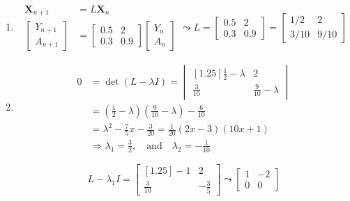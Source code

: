 \documentclass[letter,11pt]{article}
\theoremstyle{definition}
\begin{document}
\begin{tcolorbox}
    \begin{enumerate}[label = (\Alph*.)]
        \item  
            $$\begin{aligned}
                \mathbf{X}_{n+1} &= L \mathbf{X}_n\\
                \begin{bmatrix} Y_{n+1} \\ A_{n+1} \end{bmatrix} &= \begin{bmatrix} 0.5 & 2 \\ 0.3 & 0.9 \end{bmatrix} \begin{bmatrix} Y_n \\ A_n \end{bmatrix}
            \end{aligned} \leadsto \boxed{L = \begin{bmatrix} 0.5 & 2 \\ 0.3 & 0.9 \end{bmatrix} = \begin{bmatrix} 1/2 & 2 \\ 3/10 & 9/10 \end{bmatrix}}$$
        \item 
            \begin{align*}
                0 &=\operatorname{det}(L-\lambda I) = \begin{vmatrix}[1.25]\frac{1}{2}-\lambda & 2 \\ \frac{3}{10} & \frac{9}{10}-\lambda \end{vmatrix}\\
                &= \left(\frac{1}{2} - \lambda\right)\left(\frac{9}{10} - \lambda\right) - \frac{6}{10}\\
                &= \lambda^2- \frac{7}{5}x - \frac{3}{20} = \frac{1}{20}\left(2x-3\right)\left(10x+1\right)\\
                &\Rightarrow \boxed{\lambda_{1} = \frac{3}{2}, \quad \text{and}\quad \lambda_{2}=-\frac{1}{10}}
            \end{align*}
            \begin{minipage}{0.5\textwidth}
            $$L-\lambda_{1}I = \begin{bmatrix}[1.25] -1 & 2\\ \frac{3}{10} & -\frac{3}{5} \end{bmatrix}\leadsto \begin{bmatrix} 1 & -2 \\ 0 & 0\end{bmatrix}$$

\end{minipage}
\end{enumerate}
\end{tcolorbox}
\end{document}
